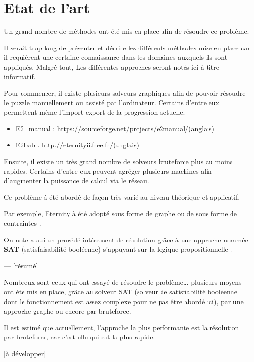 \section{Etat de l'art}

Un grand nombre de méthodes ont été mis en place afin de résoudre ce problème.

Il serait trop long de présenter et décrire les différents méthodes mise en place car il requièrent une certaine connaissance dans les domaines auxquels ils sont appliqués. Malgré tout, Les différentes approches seront notés ici à titre informatif.

Pour commencer, il existe plusieurs solveurs graphiques afin de pouvoir résoudre le puzzle manuellement ou assisté par l'ordinateur. Certains d'entre eux permettent même l'import export de la progression actuelle.

\begin{itemize}
	\item E2\_manual : \url{https://sourceforge.net/projects/e2manual/}(anglais)
	\item E2Lab : \url{http://eternityii.free.fr/}(anglais)
\end{itemize}

Ensuite, il existe un très grand nombre de solveurs bruteforce plus au moins rapides. Certains d'entre eux peuvent agréger plusieurs machines afin d'augmenter la puissance de calcul via le réseau.

Ce problème à été abordé de façon très varié au niveau théorique et applicatif.

Par exemple, Eternity à été adopté sous forme de graphe \cite{patey2010eternity} ou de sous forme de contraintes \cite{benoist2008programmation}.

On note aussi un procédé intéressent de résolution grâce à une approche nommée \textbf{SAT} (satisfaisabilité booléenne) s'appuyant sur la logique propositionnelle \cite{cuvillierresolution} \cite{heule2009solving}.

--- [résumé]

Nombreux sont ceux qui ont essayé de résoudre le problème... plusieurs moyens ont été mis en place, grâce au solveur SAT (solveur de satisfiabilité booléenne dont le fonctionnement est assez complexe pour ne pas être abordé ici), par une approche graphe ou encore par bruteforce.

Il est estimé que actuellement, l'approche la plus performante est la résolution par bruteforce, car c'est elle qui est la plus rapide.

[à développer]